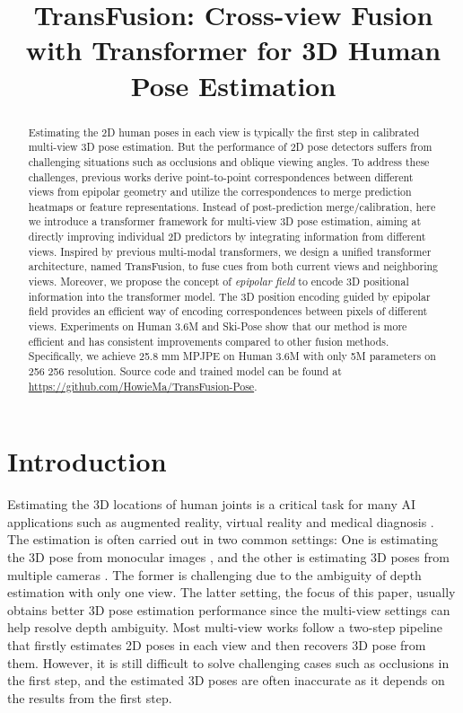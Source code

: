 \documentclass{bmvc2k}
\title{TransFusion: Cross-view Fusion with Transformer for 3D Human Pose Estimation}
\begin{document}
\maketitle

\begin{abstract}
Estimating the 2D human poses in each view is typically the first step in calibrated multi-view 3D pose estimation. But the performance of 2D pose detectors suffers from challenging situations such as occlusions and oblique viewing angles. To address these challenges, previous works derive point-to-point correspondences between different views from epipolar geometry and utilize the correspondences to merge prediction heatmaps or feature representations. Instead of post-prediction merge/calibration, here we introduce a transformer framework for multi-view 3D pose estimation, aiming at directly improving individual 2D predictors by integrating information from different views. Inspired by previous multi-modal transformers, we design a unified transformer architecture, named TransFusion, to fuse cues from both current views and neighboring views. Moreover, we propose the concept of {\em epipolar field} to encode 3D positional information into the transformer model.  The 3D position encoding guided by epipolar field provides an efficient way of encoding correspondences between pixels of different views. Experiments on Human 3.6M and Ski-Pose show that our method is more efficient and has consistent improvements compared to other fusion methods. Specifically, we achieve 25.8 mm MPJPE on Human 3.6M with only 5M parameters on 256  256 resolution. 
Source code and trained model can be found at \href{https://github.com/HowieMa/TransFusion-Pose}{https://github.com/HowieMa/TransFusion-Pose}. 
\end{abstract}



\vspace{-1.0em}
\section{Introduction}
\vspace{-0.7em}
Estimating the 3D locations of human joints is a critical task for many AI applications such as augmented reality, virtual reality and medical diagnosis \cite{chen2021pd}. The estimation is often carried out in two common settings: One is estimating the 3D pose from monocular images \cite{mehta2017vnect, zhang2019end, zimmermann2019freihand, ge20193d, wang2020predicting, chen2020dggan, chen2018generating, tome2017lifting}, and the other is estimating 3D poses from multiple cameras \cite{simon2017hand, wang2019geometric, chen2021mvhm, qiu2019cross, he2020epipolar}. The former is challenging due to the ambiguity of depth estimation with only one view. The latter setting, the focus of this paper, usually obtains better 3D pose estimation performance since the multi-view settings can help resolve depth ambiguity. Most multi-view works follow a two-step pipeline that firstly estimates 2D poses in each view and then recovers 3D pose from them. However, it is still difficult to solve challenging cases such as occlusions in the first step, and the estimated 3D poses are often inaccurate as it depends on the results from the first step. 
\end{document}
